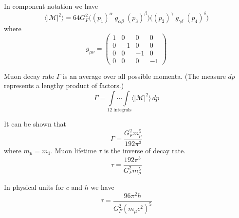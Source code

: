 \documentclass[12pt]{article}
\begin{document}
\noindent
In component notation we have
\begin{equation*}
\langle|\mathcal{M}|^2\rangle=64G_F^2
\bigg((p_1)^\alpha \; g_{\alpha\beta}\; (p_3)^\beta\bigg)
\bigg((p_2)^\gamma \; g_{\gamma\delta} \; (p_4)^\delta\bigg)
\end{equation*}
where
\begin{equation*}
g_{\mu\nu}=\begin{pmatrix}
1 & 0 & 0 & 0\\
0 & -1 & 0 & 0\\
0 & 0 & -1 & 0\\
0 & 0 & 0 & -1
\end{pmatrix}
\end{equation*}

\noindent
Muon decay rate $\Gamma$ is an average over all possible momenta.
(The measure $dp$ represents a lengthy product of factors.)
\begin{equation*}
\Gamma=
\underset{\text{12 integrals}}
{\int\cdots\int}
\langle|\mathcal{M}|^2\rangle\,dp
\end{equation*}

\noindent
It can be shown that
\begin{equation*}
\Gamma=\frac{G_F^2 m_\mu^5}{192\pi^3}
\end{equation*}
where $m_\mu=m_1$.
Muon lifetime $\tau$ is the inverse of decay rate.
\begin{equation*}
\tau=\frac{192\pi^3}{G_F^2 m_\mu^5}
\end{equation*}

\noindent
In physical units for $c$ and $h$ we have
\begin{equation*}
\tau=\frac{96\pi^2h}{G_F^2\left(m_\mu c^2\right)^5}
\end{equation*}
\end{document}
